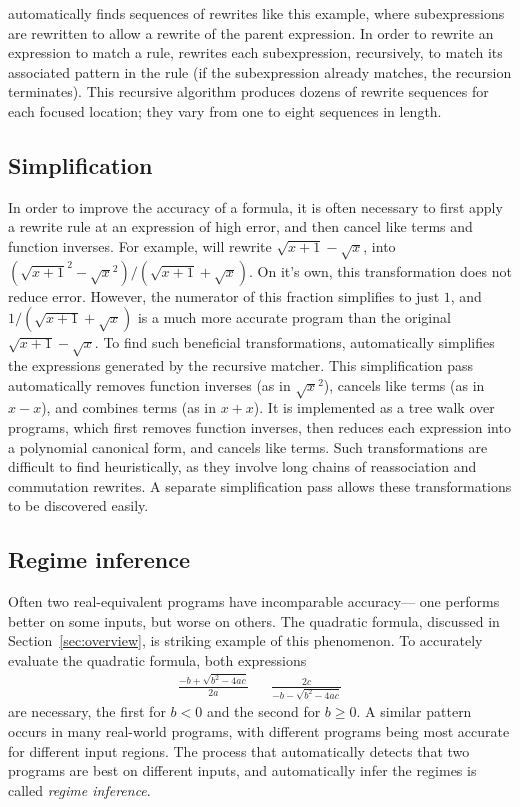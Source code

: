 \documentclass[paper.tex]{subfiles}
\begin{document}
\casio automatically finds sequences of rewrites like this example,
  where subexpressions are rewritten
  to allow a rewrite of the parent expression.
In order to rewrite an expression to match a rule,
  \casio rewrites each subexpression, recursively,
  to match its associated pattern in the rule
  (if the subexpression already matches, the recursion terminates).
This recursive algorithm produces dozens of rewrite sequences
  for each focused location; they vary from one to eight sequences in length.

\subsection{Simplification}

In order to improve the accuracy of a formula,
  it is often necessary to first apply a rewrite rule
  at an expression of high error,
  and then cancel like terms and function inverses.
For example, \casio will rewrite $\sqrt{x+1} - \sqrt{x}$,
  into $(\sqrt{x+1}^2 - \sqrt{x}^2) / (\sqrt{x+1} + \sqrt{x})$.
On it's own, this transformation does not reduce error.
However, the numerator of this fraction simplifies to just $1$,
  and $1/(\sqrt{x+1} + \sqrt{x})$ is a much more accurate program
  than the original $\sqrt{x+1} - \sqrt{x}$.
To find such beneficial transformations,
  \casio automatically simplifies the expressions generated by the recursive matcher.
This simplification pass automatically
  removes function inverses (as in $\sqrt{x}^2$),
  cancels like terms (as in $x - x$),
  and combines terms (as in $x + x$).
It is implemented as a tree walk over programs,
  which first removes function inverses,
  then reduces each expression into a polynomial canonical form,
  and cancels like terms.
Such transformations are difficult to find heuristically, 
  as they involve long chains of reassociation and commutation rewrites.
A separate simplification pass allows these transformations
  to be discovered easily.

\subsection{Regime inference}

Often two real-equivalent programs have incomparable accuracy---%
  one performs better on some inputs, but worse on others.
The quadratic formula, discussed in Section~\ref{sec:overview},
  is striking example of this phenomenon.
To accurately evaluate the quadratic formula,
  both expressions
\begin{align*}
  \frac{-b + \sqrt{b^2 - 4 a c}}{2 a} &&
  \frac{2 c}{-b - \sqrt{b^2 - 4 a c}}
\end{align*}
  are necessary,
  the first for $b < 0$ and the second for $b \ge 0$.
A similar pattern occurs in many real-world programs,
  with different programs being most accurate
  for different input regions.
The process that automatically detects
  that two programs are best on different inputs,
  and automatically infer the regimes
  is called \emph{regime inference}.
\end{document}

